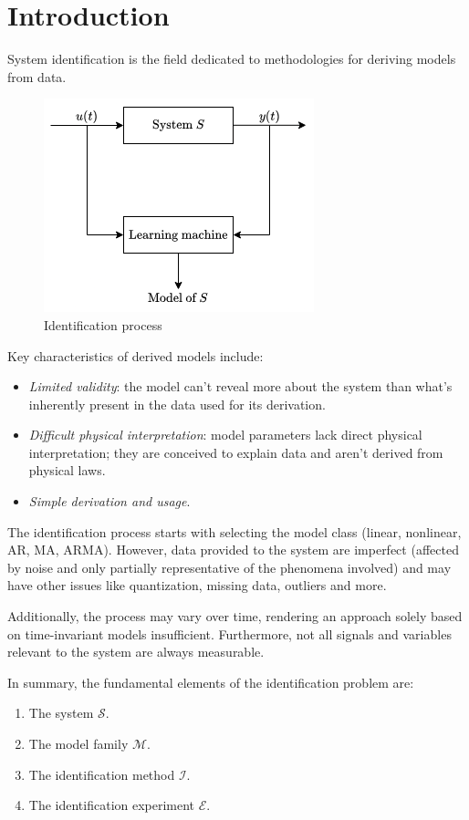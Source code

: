 \section{Introduction}

System identification is the field dedicated to methodologies for deriving models from data.
\begin{figure}[H]
    \centering
    \includegraphics[width=0.5\linewidth]{images/identification.png}
    \caption{Identification process}
\end{figure}
Key characteristics of derived models include:
\begin{itemize}
    \item \textit{Limited validity}: the model can't reveal more about the system than what's inherently present in the data used for its derivation.
    \item \textit{Difficult physical interpretation}: model parameters lack direct physical interpretation; they are conceived to explain data and aren't derived from physical laws.
    \item \textit{Simple derivation and usage}. 
\end{itemize}
The identification process starts with selecting the model class (linear, nonlinear, AR, MA, ARMA). 
However, data provided to the system are imperfect (affected by noise and only partially representative of the phenomena involved) and may have other issues like quantization, missing data, outliers and more.

Additionally, the process may vary over time, rendering an approach solely based on time-invariant models insufficient. 
Furthermore, not all signals and variables relevant to the system are always measurable.

In summary, the fundamental elements of the identification problem are:
\begin{enumerate}
    \item The system $\mathcal{S}$. 
    \item The model family $\mathcal{M}$. 
    \item The identification method $\mathcal{I}$. 
    \item The identification experiment $\mathcal{E}$. 
\end{enumerate}


